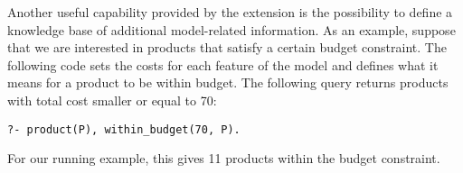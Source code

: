 \medskip\noindent Another useful capability provided by the \Prolog extension
is the possibility to define a knowledge base of additional model-related
information. As an example, suppose that we are interested in products that
satisfy a certain budget constraint. The following \Prolog code sets the costs
for each feature of the model and defines what it means for a product to be
within budget.
%
%
The following query returns products with total cost smaller or equal to 70:
\begin{lstlisting}[style=prolog]
?- product(P), within_budget(70, P).
\end{lstlisting}
%
For our running example, this gives 11 products within the budget constraint.
